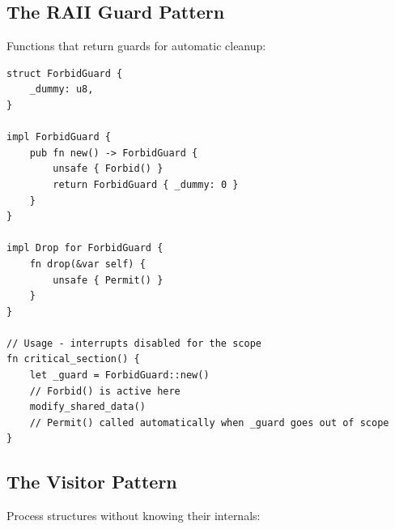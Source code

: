 \subsection{The RAII Guard Pattern}

Functions that return guards for automatic cleanup:

\begin{lstlisting}
struct ForbidGuard {
    _dummy: u8,
}

impl ForbidGuard {
    pub fn new() -> ForbidGuard {
        unsafe { Forbid() }
        return ForbidGuard { _dummy: 0 }
    }
}

impl Drop for ForbidGuard {
    fn drop(&var self) {
        unsafe { Permit() }
    }
}

// Usage - interrupts disabled for the scope
fn critical_section() {
    let _guard = ForbidGuard::new()
    // Forbid() is active here
    modify_shared_data()
    // Permit() called automatically when _guard goes out of scope
}
\end{lstlisting}

\subsection{The Visitor Pattern}

Process structures without knowing their internals:

